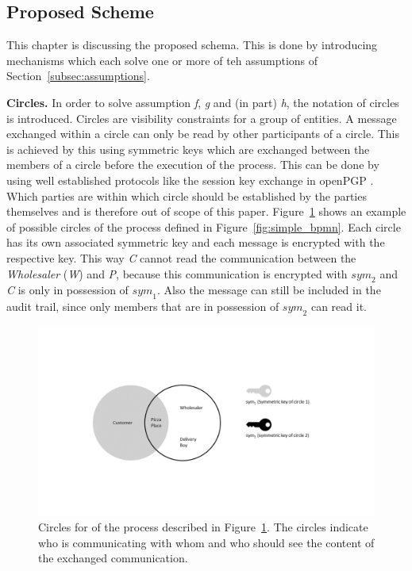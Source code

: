 \documentclass[runningheads]{llncs}
\newcommand{\ber}[1]{\textit{#1}}
\newcommand{\reffig}[1]{Figure~\ref{#1}}
\newcommand{\refsec}[1]{Section~\ref{#1}}
\newcommand{\creditfootnote}[1]{}
\begin{document}
\subsection{Proposed Scheme} \label{subsec:scheme}


This chapter is discussing the proposed schema. This is done by introducing mechanisms which each solve one or more of teh assumptions of \refsec{subsec:assumptions}.


\textbf{Circles.} In order to solve assumption \ber{f}, \ber{g} and (in part) \ber{h}, the notation of circles is introduced. Circles are visibility constraints for a group of entities. A message exchanged within a circle can only be read by other participants of a circle. This is achieved by this using symmetric keys which are exchanged between the members of a circle before the execution of the process. This can be done by using well established protocols like the session key exchange in openPGP \cite{openpgp}. Which parties are within which circle should be established by the parties themselves and is therefore out of scope of this paper. \reffig{fig:circles} shows an example of possible circles of the process defined in  \reffig{fig:simple_bpmn}. Each circle has its own associated symmetric key and each message is encrypted with the respective key. This way \ber{C} cannot read the communication between the \ber{Wholesaler} (\ber{W}) and \ber{P}, because this communication is encrypted with ${sym}_2$ and \ber{C} is only in possession of ${sym}_1$. Also the message can still be included in the audit trail, since only members that are in possession of ${sym}_2$ can read it.\creditfootnote{Credit: key-icons in \reffig{fig:circles} made by Yannick (http://yanlu.de) from www.flaticon.com}


\begin{center}
\begin{figure}
    \centering
    \includegraphics[trim=5cm 5cm 6cm 5.6cm,clip=true,scale=0.5]{circles.png}
    \caption{Circles for of the process described in \reffig{fig:circles}. The circles indicate who is communicating with whom and who should see the content of the exchanged communication.} 
    \label{fig:circles}
\end{figure}
\end{center}
\end{document}
